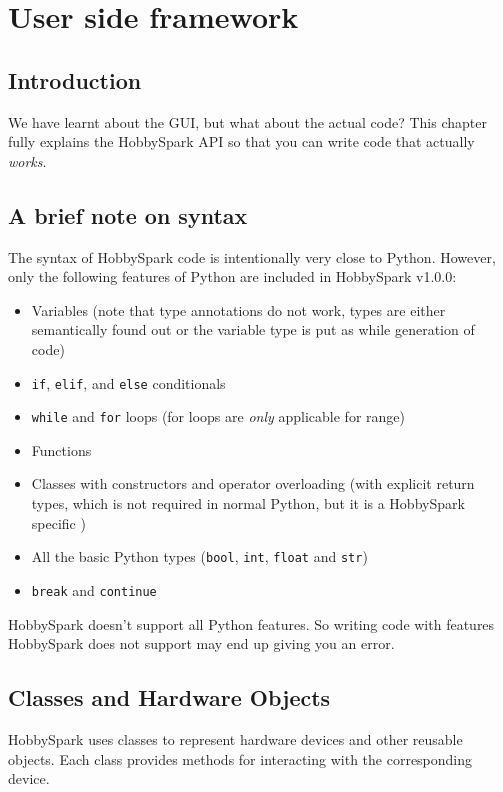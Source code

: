 \chapter{User side framework}
\section{Introduction}
We have learnt about the GUI, but what about the actual code? This chapter fully explains the HobbySpark API so that you can write code that actually \emph{works}.

\section{A brief note on syntax}
\label{sec:syn}
The syntax of HobbySpark code is intentionally very close to Python. However, only the following features of Python are included in HobbySpark v1.0.0:
\begin{itemize}
	\item Variables (note that type annotations do not work, types are either semantically found out or the variable type is put as  while generation of  code)
	\item \texttt{if}, \texttt{elif}, and \texttt{else} conditionals
	\item \texttt{while} and \texttt{for} loops (for loops are \emph{only} applicable for range)
	\item Functions
	\item Classes with constructors and operator overloading (with explicit return types, which is not required in normal Python, but it is a HobbySpark specific )
	\item All the basic Python types (\texttt{bool}, \texttt{int}, \texttt{float} and \texttt{str})
	\item \texttt{break} and \texttt{continue}
\end{itemize}
\begin{warningbox}
	HobbySpark doesn't support all Python features. So writing code with features HobbySpark does not support may end up giving you an error.
\end{warningbox}

\section{Classes and Hardware Objects}

HobbySpark uses classes to represent hardware devices and other
reusable objects. Each class provides methods for interacting with
the corresponding device.

